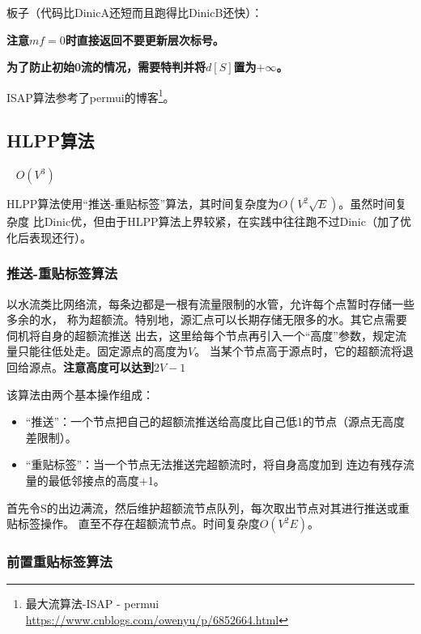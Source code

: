 板子（代码比DinicA还短而且跑得比DinicB还快）：


{\bfseries 注意$mf=0$时直接返回不要更新层次标号。}

{\bfseries 为了防止初始0流的情况，需要特判并将$d[S]$置为$+\infty$。}

ISAP算法参考了permui的博客\footnote{ 最大流算法-ISAP - permui
\url{https://www.cnblogs.com/owenyu/p/6852664.html}}。

\subsection{HLPP算法}

\cite{ITA3}~
$O(V^3)$

HLPP算法使用``推送-重贴标签''算法，其时间复杂度为$O(V^2\sqrt{E})$。虽然时间复杂度
比Dinic优，但由于HLPP算法上界较紧，在实践中往往跑不过Dinic（加了优化后表现还行）。

\subsubsection{推送-重贴标签算法}

以水流类比网络流，每条边都是一根有流量限制的水管，允许每个点暂时存储一些多余的水，
称为超额流。特别地，源汇点可以长期存储无限多的水。其它点需要伺机将自身的超额流推送
出去，这里给每个节点再引入一个``高度''参数，规定流量只能往低处走。固定源点的高度为$V$。
当某个节点高于源点时，它的超额流将退回给源点。{\bfseries 注意高度可以达到$2V-1$}

该算法由两个基本操作组成：
\begin{itemize}
	\item ``推送''：一个节点把自己的超额流推送给高度比自己低1的节点（源点无高度差限制）。
	\item ``重贴标签''：当一个节点无法推送完超额流时，将自身高度加到
	连边有残存流量的最低邻接点的高度+1。
\end{itemize}

首先令S的出边满流，然后维护超额流节点队列，每次取出节点对其进行推送或重贴标签操作。
直至不存在超额流节点。时间复杂度$O(V^2E)$。

\subsubsection{前置重贴标签算法}

